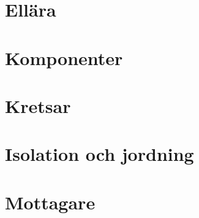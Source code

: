 
\chapter{Ellära}
\label{ellära}
%
\chapter{Komponenter}
\label{komponenter}

\chapter{Kretsar}
% 
% 
% 
% 
% 
% 
% 
% 
% 
% 
%
\chapter[Isolation och jord]{Isolation och jordning}
% 
%
\chapter{Mottagare}
% 
% 
% 
% 
% 
% 
% 
% 
% 
%
